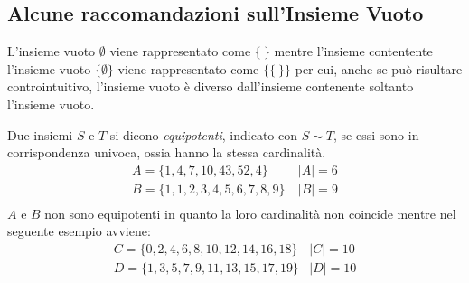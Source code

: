 \subsection{Alcune raccomandazioni sull'Insieme Vuoto}
L'insieme vuoto $\emptyset$ viene rappresentato come $\{ \ \}$ mentre l'insieme contentente
l'insieme vuoto $\{ \emptyset \}$ viene rappresentato come $\{ \{ \ \} \}$ per cui,
anche se può risultare controintuitivo, l'insieme vuoto è diverso dall'insieme
contenente soltanto l'insieme vuoto.

Due insiemi $S$ e $T$ si dicono \textit{equipotenti}, indicato con $S \sim T$, se
essi sono in corrispondenza univoca, ossia hanno la stessa cardinalità.
\begin{equation*}
\begin{split}
A = \{ 1,4,7,10,43,52,4 \} & \ |A| = 6 \\
B = \{1,1,2,3,4,5,6,7,8,9 \} & \ |B| = 9 \\
\end{split}
\end{equation*}
$A$ e $B$ non sono equipotenti in quanto la loro cardinalità non coincide mentre
nel seguente esempio avviene:
\begin{equation*}
\begin{split}
C = \{0,2,4,6,8,10,12,14,16,18\} & |C| = 10 \\
D = \{1,3,5,7,9,11,13,15,17,19\} & |D| = 10 \\
\end{split}
\end{equation*}
